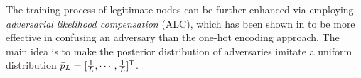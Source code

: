 \documentclass[conference]{IEEEtran}
\begin{document}
	The training process of legitimate nodes can be further enhanced via employing  \emph{adversarial likelihood compensation} (ALC), which has been shown in \cite{AE-Deniz} to be more effective in confusing an adversary than the one-hot encoding approach.   
		The main idea is to make the posterior distribution  of  adversaries 
		imitate a uniform distribution $\bar{p}_L = [\frac{1}{L},\cdots,\frac{1}{L}]^{\sf T}$. 
\end{document}
